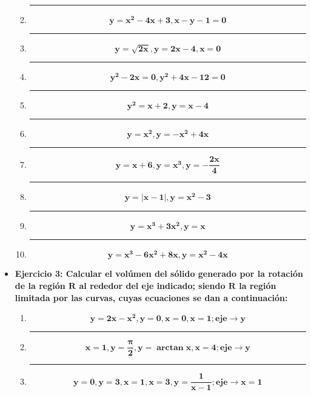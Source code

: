 \documentclass[12pt]{article}
\begin{document}
\begin{itemize}
\begin{enumerate}
                \hrule
                \item \[\bm{y = x^2 - 4x + 3, x - y - 1 = 0}\]
            
                \hrule
                \item \[\bm{y = \sqrt{2x}, y = 2x - 4, x = 0}\]

                \hrule
                \item \[\bm{y^2 - 2x = 0, y^2 + 4x - 12 = 0}\]

                \hrule
                \item \[\bm{y^2 = x + 2, y = x - 4}\]

                \hrule
                \item \[\bm{y = x^2, y = - x^2 + 4x}\]

                \hrule
                \item \[\bm{y = x + 6, y = x^3, y = - \frac{2x}{4}}\]
                
                \hrule
                \item \[\bm{y = \left|x - 1\right|, y = x^2 - 3}\]
                
                \hrule
                \item \[\bm{y = x^3 + 3x^2, y = x}\]
                
                \hrule
                \item \[\bm{y = x^3 - 6x^2 + 8x, y = x^2 - 4x}\]

            \end{enumerate}
        
        \item \textbf{Ejercicio 3: Calcular el volúmen del sólido generado por la rotación de la región $\bm{R}$ al rededor del eje indicado; siendo $\bm{R}$ la región limitada por las curvas, cuyas ecuaciones se dan a continuación:} \vspace{0.5cm}
            \begin{enumerate}[label=\alph*.]
                \hrule
                \item \[\bm{y = 2x - x^2, y = 0, x = 0, x = 1; eje \rightarrow y}\]
                
                \hrule
                \item \[\bm{x = 1, y = \frac{\pi}{2}, y = \arctan{x}, x = 4; eje \rightarrow y}\]
                
                \hrule
                \item \[\bm{y = 0, y = 3, x = 1, x = 3, y = \frac{1}{x - 1}; eje \rightarrow x = 1}\]
                

\end{enumerate}
\end{itemize}
\end{document}

